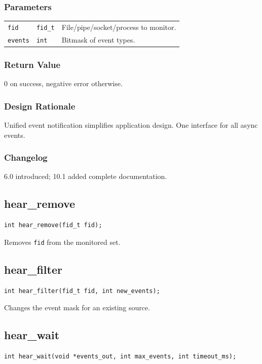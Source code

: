 \documentclass[12pt,a4paper]{article}
\begin{document}
\subsubsection{Parameters}
\begin{tabularx}{\textwidth}{|l|l|X|}
\hline
\verb|fid| & \verb|fid_t| & File/pipe/socket/process to monitor. \\
\verb|events| & \verb|int| & Bitmask of event types. \\
\hline
\end{tabularx}

\subsubsection{Return Value}
0 on success, negative error otherwise.

\subsubsection{Design Rationale}
Unified event notification simplifies application design. One interface for all async events.

\subsubsection{Changelog}
6.0 introduced; 10.1 added complete documentation.

\subsection{hear\_remove}
\begin{lstlisting}
int hear_remove(fid_t fid);
\end{lstlisting}
Removes \texttt{fid} from the monitored set.

\subsection{hear\_filter}
\begin{lstlisting}
int hear_filter(fid_t fid, int new_events);
\end{lstlisting}
Changes the event mask for an existing source.

\subsection{hear\_wait}
\begin{lstlisting}
int hear_wait(void *events_out, int max_events, int timeout_ms);
\end{lstlisting}
\end{document}
